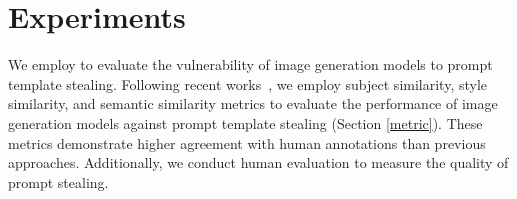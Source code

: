 \section{Experiments}


We employ \data to evaluate the vulnerability of image generation models to prompt template stealing.
Following recent works~\citep{shen2024prompt, naseh2024iteratively, huang2024vbench}, we employ subject similarity, style similarity, and semantic similarity metrics to evaluate the performance of image generation models against prompt template stealing (Section \ref{metric}). These metrics demonstrate higher agreement with human annotations than previous approaches.
Additionally, we conduct human evaluation to measure the quality of prompt stealing.





